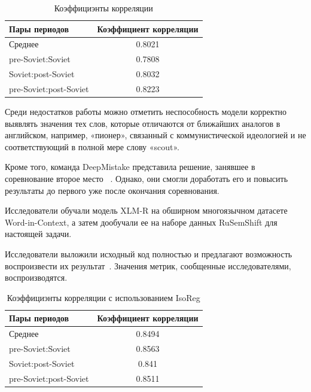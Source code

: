 \documentclass[LI,VKR]{HSEUniversity}
\begin{document}
\begin{table}[H]
\centering
\caption{Коэффициэнты корреляции}
\begin{tabular}{lc}
\hline
Пары периодов                  & Коэффициент корреляции \\
\hline
Среднее            & 0.8021                  \\
pre-Soviet:Soviet           & 0.7808                  \\
Soviet:post-Soviet          & 0.8032                  \\
pre-Soviet:post-Soviet      & 0.8223                  \\
\hline
\end{tabular}
\end{table}

Среди недостатков работы можно отметить неспособность модели корректно выявлять
значения тех слов, которые отличаются от ближайших аналогов в английском, например,
«пионер», связанный с коммунистической идеологией и не соответствующий в полной мере
слову «scout».

Кроме того, команда DeepMistake представила решение, занявшее в соревнование второе место
~\cite{DeepMistake}.
Однако, они смогли доработать его и повысить результаты до первого уже после окончания
соревнования.

Исследователи обучали модель XLM-R на обширном многоязычном датасете Word-in-Context,
а затем дообучали ее на наборе данных RuSemShift для настоящей задачи.

Исследователи выложили исходный код полностью и предлагают возможность воспроизвести их
результат~.
Значения метрик, сообщенные исследователями, воспроизводятся.

\begin{table}[H]
\centering
\caption{Коэффициэнты корреляции с использованием IsoReg}
\begin{tabular}{lc}
\hline
Пары периодов                  & Коэффициент корреляции \\
\hline
Среднее            & 0.8494                  \\
pre-Soviet:Soviet           & 0.8563                  \\
Soviet:post-Soviet          & 0.841                  \\
pre-Soviet:post-Soviet      & 0.8511                  \\
\hline
\end{tabular}
\end{table}
\end{document}
